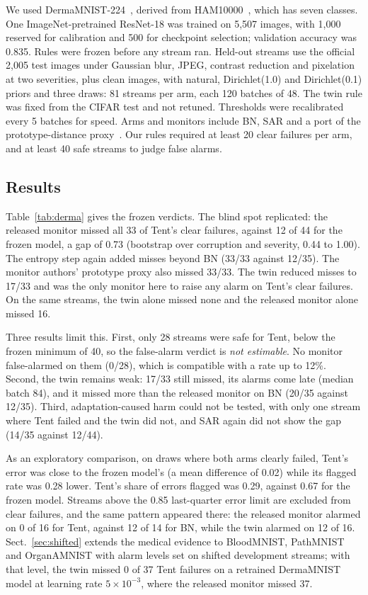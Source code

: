 \documentclass[runningheads]{llncs}
\begin{document}
We used DermaMNIST-224~\cite{Yang2023MedMNIST}, derived from HAM10000~\cite{Tschandl2018HAM}, which has seven classes. One ImageNet-pretrained ResNet-18 was trained on 5,507 images, with 1,000 reserved for calibration and 500 for checkpoint selection; validation accuracy was 0.835. Rules were frozen before any stream ran. Held-out streams use the official 2,005 test images under Gaussian blur, JPEG, contrast reduction and pixelation at two severities, plus clean images, with natural, Dirichlet(1.0) and Dirichlet(0.1) priors and three draws: 81 streams per arm, each 120 batches of 48. The twin rule was fixed from the CIFAR test and not retuned. Thresholds were recalibrated every 5 batches for speed. Arms and monitors include BN, SAR and a port of the prototype-distance proxy~\cite{Schirmer2025Monitoring}. Our rules required at least 20 clear failures per arm, and at least 40 safe streams to judge false alarms.

\subsection{Results}
Table~\ref{tab:derma} gives the frozen verdicts. The blind spot replicated: the released monitor missed all 33 of Tent's clear failures, against 12 of 44 for the frozen model, a gap of 0.73 (bootstrap over corruption and severity, 0.44 to 1.00). The entropy step again added misses beyond BN (33/33 against 12/35). The monitor authors' prototype proxy also missed 33/33. The twin reduced misses to 17/33 and was the only monitor here to raise any alarm on Tent's clear failures. On the same streams, the twin alone missed none and the released monitor alone missed 16.

Three results limit this. First, only 28 streams were safe for Tent, below the frozen minimum of 40, so the false-alarm verdict is \emph{not estimable}. No monitor false-alarmed on them (0/28), which is compatible with a rate up to 12\%. Second, the twin remains weak: 17/33 still missed, its alarms come late (median batch 84), and it missed more than the released monitor on BN (20/35 against 12/35). Third, adaptation-caused harm could not be tested, with only one stream where Tent failed and the twin did not, and SAR again did not show the gap (14/35 against 12/44).

As an exploratory comparison, on draws where both arms clearly failed, Tent's error was close to the frozen model's (a mean difference of 0.02) while its flagged rate was 0.28 lower. Tent's share of errors flagged was 0.29, against 0.67 for the frozen model. Streams above the 0.85 last-quarter error limit are excluded from clear failures, and the same pattern appeared there: the released monitor alarmed on 0 of 16 for Tent, against 12 of 14 for BN, while the twin alarmed on 12 of 16. Sect.~\ref{sec:shifted} extends the medical evidence to BloodMNIST, PathMNIST and OrganAMNIST with alarm levels set on shifted development streams; with that level, the twin missed 0 of 37 Tent failures on a retrained DermaMNIST model at learning rate $5\times10^{-3}$, where the released monitor missed 37.
\end{document}

